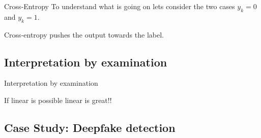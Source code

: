 \documentclass{beamer}
\begin{document}
    \begin{frame}{Cross-Entropy}
      To understand what is going on lets consider the two cases $y_k = 0$ and $y_k = 1$.
      \begin{figure}
        
        
      \end{figure}
      Cross-entropy pushes the output towards the label.
    \end{frame}

    \subsection{Interpretation by examination}
    \begin{frame}{Interpretation by examination}
      \begin{figure}
        
        
      \end{figure}
      If linear is possible linear is great!!
    \end{frame}

    \subsection{Case Study: Deepfake detection}
\end{document}

